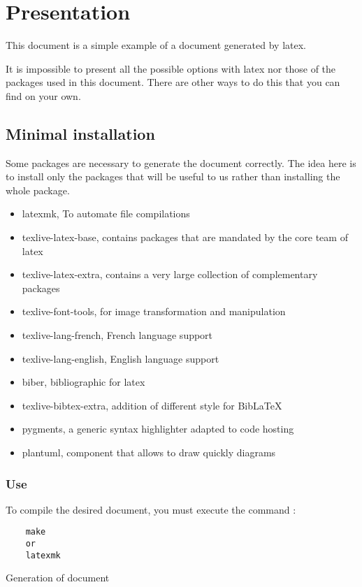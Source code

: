 \section{Presentation}
This document is a simple example of a document generated by \gls{latex}. \newline

It is impossible to present all the possible options with \gls{latex} nor those of the packages used
in this document.
There are other ways to do this that you can find on your own.

\subsection{Minimal installation}
Some packages are necessary to generate the document correctly.
The idea here is to install only the packages that will be useful to us rather than installing the
whole package.
\begin{itemize}
    \item latexmk, To automate file compilations
    \item texlive-latex-base, contains packages that are mandated by the core team of \gls{latex}
    \item texlive-latex-extra, contains a very large collection of complementary packages
    \item texlive-font-tools, for image transformation and manipulation
    \item texlive-lang-french, French language support
    \item texlive-lang-english, English language support
    \item biber, bibliographic for \gls{latex}
    \item texlive-bibtex-extra, addition of different style for BibLaTeX
    \item pygments, a generic syntax highlighter adapted to code hosting
    \item plantuml, component that allows to draw quickly diagrams
\end{itemize}

\subsubsection{Use}
To compile the desired document, you must execute the command :
\begin{code}
    \begin{verbatim}
    make
    or
    latexmk
\end{verbatim}
    \caption{Generation of document}
\end{code}

